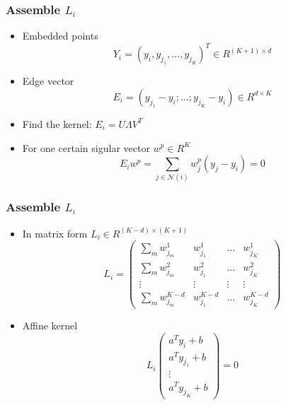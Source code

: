 \documentclass[serif,mathserif, 12pt]{beamer}
\begin{document}
\begin{frame}
  \frametitle{Assemble $L_i$}
  \begin{itemize}
  \item Embedded points
    \begin{equation*}
      Y_i = (y_i, y_{j_1}, \dots, y_{j_K})^T \in R^{(K+1)\times d}
    \end{equation*}
  \item Edge vector
    \begin{equation*}
      E_i = (y_{j_1}-y_i; \dots; y_{j_K}-y_i) \in R^{d\times K}
    \end{equation*}
  \item Find the kernel: $E_i = U\Lambda V^T$
  \item For one certain sigular vector $w^p \in R^K$
    \begin{equation*}
      E_i w^p = \sum_{j\in \mathcal{N}(i)} w^p_j(y_{j}-y_i) = 0
    \end{equation*}
  \end{itemize}
\end{frame}

\begin{frame}
  \frametitle{Assemble $L_i$}
  \begin{itemize}
  \item In matrix form $L_i \in R^{(K-d)\times (K+1)}$
    \begin{equation*}
      L_i = 
      \begin{pmatrix}
        \sum_m w^1_{j_m} & w^1_{j_1} & \dots & w^1_{j_K} \\
        \sum_m w^2_{j_m} & w^2_{j_1} & \dots & w^2_{j_K} \\
        \vdots & \vdots & \vdots &\vdots \\
        \sum_m w^{K-d}_{j_m} & w^{K-d}_{j_1} & \dots & w^{K-d}_{j_K} 
      \end{pmatrix}
    \end{equation*}
  \item Affine kernel
    \begin{equation*}
      L_i
      \begin{pmatrix}
        a^Ty_{i}+b \\
        a^Ty_{j_1}+b \\
        \vdots \\
        a^Ty_{j_K}+b         
      \end{pmatrix}
      =0
    \end{equation*}
  \end{itemize}
\end{frame}
\end{document}
